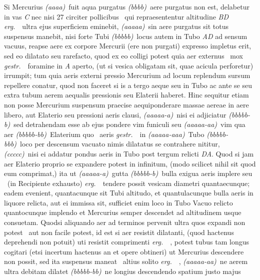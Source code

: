 {{Si Mercurius\protect{} \textit{(aaaa)}\ fuit aqua purgatus \textit{(bbbb)}\ aere purgatus non est, delabetur in vas \textit{C} nec nisi 27 circiter pollicibus  \textbar\ qui repraesententur altitudine \textit{BD} \textit{ erg.}\ \textbar\ ultra ejus superficiem eminebit, \textit{(aaaaa)}\ sin aere purgatus sit totus suspensus manebit, nisi forte Tubi \textit{(bbbbb)}\ locus autem in Tubo \textit{AD} ad sensum vacuus, reapse aere ex corpore Mercurii\protect{} (ere non purgati) expresso impletus erit, sed eo dilatato seu rarefacto, quod ex eo colligi potest quia aer externus \textbar\ mox \textit{ gestr.}\ \textbar\ foramine in \textit{A} aperto, (ut si vesica obligatam sit, quae acicula perforetur) irrumpit; tum quia aeris externi pressio\protect{} Mercurium\protect{} ad locum replendum sursum repellere conatur, quod non faceret si is a tergo aeque seu in Tubo ac ante se seu extra tubum aerem aequalis pressionis seu Elaterii\protect{} haberet. Hinc sequitur etiam non posse Mercurium\protect{} suspensum praecise aequiponderare massae\protect{} aereae in aere libero, aut Elaterio\protect{} seu pressioni aeris\protect{} clausi, \textit{(aaaaa-a)}\ nisi ei adjiciatur \textit{(bbbbb-b)}\ sed detrahendam esse ab ejus pondere vim funiculi\protect{} seu \textit{(aaaaa-aa)}\ vim qua aer \textit{(bbbbb-bb)}\ Elaterium\protect{} quo \textbar\ aeris \textit{ gestr.}\ \textbar\  in \textit{(aaaaa-aaa)}\ Tubo \textit{(bbbbb-bbb)}\ loco per descensum vacuato nimis dilatatus se contrahere nititur, \textit{(ccccc)}\ nisi ei addatur pondus aeris\protect{} in Tubo post tergum relicti \textit{DA}. Quod si jam aer Elaterio\protect{} proprio se expandere potest in infinitum, (modo scilicet nihil sit quod eum comprimat,) ita ut \textit{(aaaaa-a)}\ gutta \textit{(bbbbb-b)}\ bulla exigua aeris implere seu  \textbar\ (in Recipiente exhausto) \textit{ erg.}\ \textbar\  tendere possit vesicam diametri quantaecunque; eadem evenient, quantacunque sit Tubi altitudo, et quantulacunque bulla aeris in liquore relicta, aut ei immissa sit, sufficiet enim loco in Tubo Vacuo relicto quantocunque implendo et Mercurius\protect{} semper descendet ad altitudinem usque consuetam. Quodsi aliquando aer ad terminos pervenit ultra quos expandi non potest  \textbar\ aut non facile potest, id est si aer resistit dilatanti, (quod hactenus deprehendi non potuit) uti resistit comprimenti \textit{ erg.}\ \textbar\ , potest tubus tam longus cogitari (etsi incertum hactenus an et opere obtineri) ut Mercurius\protect{} descendere non possit, sed ita suspensus maneat  \textbar\ altius solito \textit{ erg.}\ \textbar\ ,  \textit{(aaaaa-aa)}\ ne aerem ultra debitam dilatet \textit{(bbbbb-bb)}\ ne longius descendendo spatium justo majus }}
